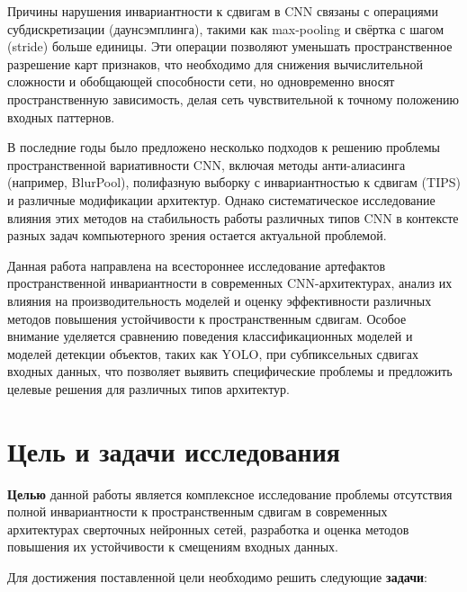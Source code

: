 Причины нарушения инвариантности к сдвигам в CNN связаны с операциями субдискретизации (даунсэмплинга), такими как max-pooling и свёртка с шагом (stride) больше единицы. Эти операции позволяют уменьшать пространственное разрешение карт признаков, что необходимо для снижения вычислительной сложности и обобщающей способности сети, но одновременно вносят пространственную зависимость, делая сеть чувствительной к точному положению входных паттернов.

В последние годы было предложено несколько подходов к решению проблемы пространственной вариативности CNN, включая методы анти-алиасинга (например, BlurPool), полифазную выборку с инвариантностью к сдвигам (TIPS) и различные модификации архитектур. Однако систематическое исследование влияния этих методов на стабильность работы различных типов CNN в контексте разных задач компьютерного зрения остается актуальной проблемой.

Данная работа направлена на всестороннее исследование артефактов пространственной инвариантности в современных CNN-архитектурах, анализ их влияния на производительность моделей и оценку эффективности различных методов повышения устойчивости к пространственным сдвигам. Особое внимание уделяется сравнению поведения классификационных моделей и моделей детекции объектов, таких как YOLO, при субпиксельных сдвигах входных данных, что позволяет выявить специфические проблемы и предложить целевые решения для различных типов архитектур.

\section*{Цель и задачи исследования}
\label{intro:goal}

\textbf{Целью} данной работы является комплексное исследование проблемы отсутствия полной инвариантности к пространственным сдвигам в современных архитектурах сверточных нейронных сетей, разработка и оценка методов повышения их устойчивости к смещениям входных данных.

Для достижения поставленной цели необходимо решить следующие \textbf{задачи}:

